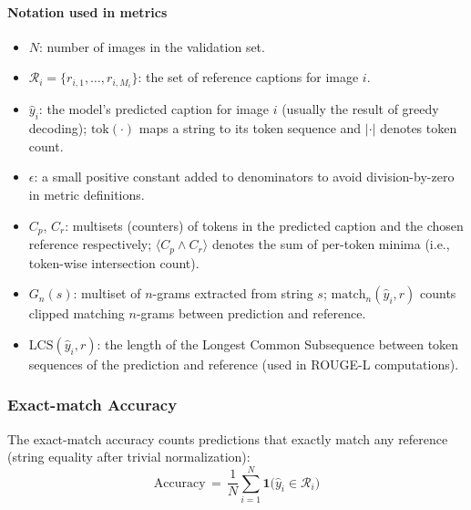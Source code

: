 \paragraph{Notation used in metrics}
\begin{itemize}
    \item $N$: number of images in the validation set.
    \item $\mathcal{R}_i = \{r_{i,1},\dots,r_{i,M_i}\}$: the set of reference captions for image $i$.
    \item $\hat{y}_i$: the model's predicted caption for image $i$ (usually the result of greedy decoding); $\mathrm{tok}(\cdot)$ maps a string to its token sequence and $|\cdot|$ denotes token count.
    \item $\epsilon$: a small positive constant added to denominators to avoid division-by-zero in metric definitions.
    \item $C_p$, $C_r$: multisets (counters) of tokens in the predicted caption and the chosen reference respectively; $\langle C_p \wedge C_r\rangle$ denotes the sum of per-token minima (i.e., token-wise intersection count).
    \item $G_n(s)$: multiset of $n$-grams extracted from string $s$; $\mathrm{match}_n(\hat{y}_i,r)$ counts clipped matching $n$-grams between prediction and reference.
    \item $\mathrm{LCS}(\hat{y}_i,r)$: the length of the Longest Common Subsequence between token sequences of the prediction and reference (used in ROUGE-L computations).
\end{itemize}

\subsubsection{Exact-match Accuracy}
The exact-match accuracy counts predictions that exactly match any reference (string equality after trivial normalization):
\begin{equation}
    \mathrm{Accuracy} \,=\, \frac{1}{N} \sum_{i=1}^{N} \mathbf{1}\bigl(\hat{y}_i \in \mathcal{R}_i\bigr)
\end{equation}

